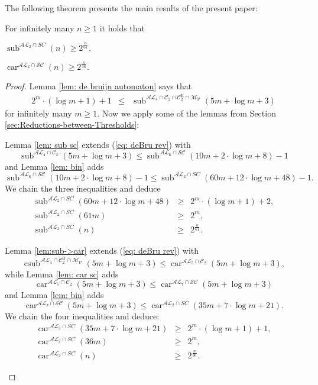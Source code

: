 \documentclass{ws-ijmpc}
\DeclareMathOperator{\car}{car}
\DeclareMathOperator{\sub}{sub}
\DeclareMathOperator{\csub}{csub}
\begin{document}
The following theorem presents the main results of the present paper:
\begin{theorem}
\label{thm: main}For infinitely many $n\ge1$ it holds that\end{theorem}
\begin{romanlist}
\item $\sub^{\mathcal{AL}_{2}\cap SC}\!\left(n\right)\ge2^{\frac{n}{61}},$
\item $\car^{\mathcal{AL}_{2}\cap\mathcal{SC}}\!\left(n\right)\ge2^{\frac{n}{36}}.$\end{romanlist}
\begin{proof}
Lemma \ref{lem: de bruijn automaton} says that
\begin{eqnarray}
2^{m}\cdot\left(\log m+1\right)+1 & \le & \sub^{\mathcal{AL}_{4}\cap\mathcal{C}_{2}\cap\mathcal{C}_{2}^{\mathrm{R}}\cap\mathcal{M}_{\mathrm{P}}}\!\left(5m+\log m+3\right)\label{eq: deBru rev}
\end{eqnarray}
for infinitely many $m\ge1$. Now we apply some of the lemmas from
Section \ref{sec:Reductions-between-Thresholds}:
\begin{romanlist}
\item Lemma \ref{lem: sub sc} extends (\ref{eq: deBru rev}) with
\[
\sub^{\mathcal{AL}_{4}\cap\mathcal{C}_{2}}\!\left(5m+\log m+3\right)\le\sub^{\mathcal{AL}_{6}\cap\mathcal{SC}}\!\left(10m+2\cdot\log m+8\right)-1
\]
and Lemma \ref{lem: bin} adds
\[
\sub^{\mathcal{AL}_{6}\cap\mathcal{SC}}\!\left(10m+2\cdot\log m+8\right)-1\le\sub^{\mathcal{AL}_{2}\cap SC}\!\left(60m+12\cdot\log m+48\right)-1.
\]
We chain the three inequalities and deduce
\begin{eqnarray*}
\sub^{\mathcal{AL}_{2}\cap SC}\!\left(60m+12\cdot\log m+48\right) & \ge & 2^{m}\cdot\left(\log m+1\right)+2,\\
\sub^{\mathcal{AL}_{2}\cap SC}\!\left(61m\right) & \ge & 2^{m},\\
\sub^{\mathcal{AL}_{2}\cap SC}\!\left(n\right) & \ge & 2^{\frac{n}{61}}.
\end{eqnarray*}

\item Lemma \ref{lem:sub->car} extends (\ref{eq: deBru rev}) with
\[
\csub^{\mathcal{AL}_{4}\cap\mathcal{C}_{2}^{\mathrm{R}}\cap\mathcal{M}_{\mathrm{P}}}\!\left(5m+\log m+3\right)\le\car^{\mathcal{AL}_{5}\cap\mathcal{C}_{2}}\!\left(5m+\log m+3\right),
\]
while Lemma \ref{lem: car sc} adds 
\[
\car^{\mathcal{AL}_{5}\cap\mathcal{C}_{2}}\!\left(5m+\log m+3\right)\le\car^{\mathcal{AL}_{7}\cap\mathcal{SC}}\!\left(5m+\log m+3\right)
\]
and Lemma \ref{lem: bin} adds
\[
\car^{\mathcal{AL}_{7}\cap\mathcal{SC}}\!\left(5m+\log m+3\right)\le\car^{\mathcal{AL}_{2}\cap SC}\!\left(35m+7\cdot\log m+21\right).
\]
We chain the four inequalities and deduce:
\begin{eqnarray*}
\car^{\mathcal{AL}_{2}\cap SC}\!\left(35m+7\cdot\log m+21\right) & \ge & 2^{m}\cdot\left(\log m+1\right)+1,\\
\car^{\mathcal{AL}_{2}\cap SC}\!\left(36m\right) & \ge & 2^{m},\\
\car^{\mathcal{AL}_{2}\cap SC}\!\left(n\right) & \ge & 2^{\frac{n}{36}}.
\end{eqnarray*}


\end{romanlist}
\end{proof}
\end{document}
